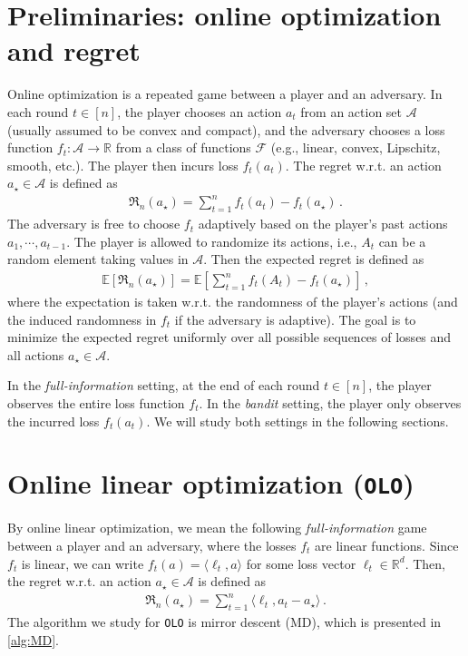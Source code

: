 \documentclass{article}
\theoremstyle{plain}
\theoremstyle{definition}
\newcommand{\R}{\mathbb R}
\newcommand{\Rd}{\mathbb{R}^d}
\newcommand{\Reg}{\mathfrak{R}}
\newcommand{\E}{\mathbb E}
\newcommand{\cF}{\mathcal F}
\newcommand{\cA}{\mathcal A}
\newcommand{\mdalg}{\textsf{MD}\xspace}
\newcommand{\olo}{\texttt{OLO}\xspace}
\begin{document}
\section{Preliminaries: online optimization and regret}
Online optimization is a repeated game between a player and an adversary.
In each round $t \in [n]$, the player chooses an action $a_t$ from an action set $\cA$ (usually assumed to be convex and compact), and the adversary chooses a loss function $f_t: \cA \to \R$ from a class of functions $\cF$ (e.g., linear, convex, Lipschitz, smooth, etc.).
The player then incurs loss $f_t(a_t)$.
The regret w.r.t. an action $a_\star \in \cA$ is defined as
\begin{align*}
    \Reg_n(a_\star) = \sum_{t=1}^{n} f_t(a_t) - f_t(a_\star)\,.
\end{align*}
The adversary is free to choose $f_t$ adaptively based on the player's past actions $a_1, \cdots, a_{t-1}$.
The player is allowed to randomize its actions, i.e., $A_t$ can be a random element taking values in $\cA$.
Then the expected regret is defined as
\begin{align*}
    \E[\Reg_n(a_\star)] = \E\left[\sum_{t=1}^{n} f_t(A_t) - f_t(a_\star)\right]\,,
\end{align*}
where the expectation is taken w.r.t. the randomness of the player's actions (and the induced randomness in $f_t$ if the adversary is adaptive).
The goal is to minimize the expected regret uniformly over all possible sequences of losses and all actions $a_\star \in \cA$.

In the \textit{full-information} setting, at the end of each round $t \in [n]$,
the player observes the entire loss function $f_t$.
In the \textit{bandit} setting, the player only observes the incurred loss $f_t(a_t)$.
We will study both settings in the following sections.

\section{Online linear optimization (\texttt{OLO})}
By online linear optimization, we mean the following \textit{full-information} game between a player and an adversary, where the losses $f_t$ are linear functions.
Since $f_t$ is linear, we can write $f_t(a) = \langle \ell_t, a \rangle$ for some loss vector $\ell_t \in \Rd$.
Then, the regret w.r.t. an action $a_\star \in \cA$ is defined as
\begin{align*}
    \Reg_n(a_\star) = \sum_{t=1}^{n} \langle \ell_t, a_t - a_\star \rangle\,.
\end{align*}
The algorithm we study for \olo is mirror descent (\mdalg),
which is presented in \cref{alg:MD}.
\end{document}
